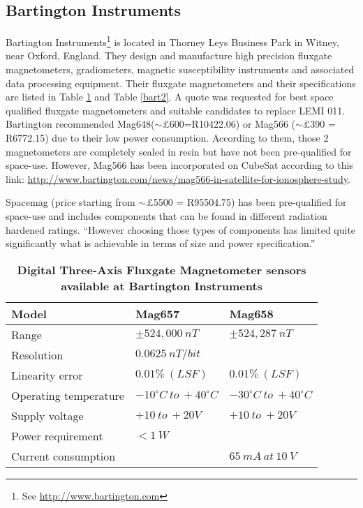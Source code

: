 \documentclass[a4paper,10pt]{report}
\begin{document}
\subsection*{Bartington Instruments}
Bartington Instruments\footnote{See \url{http://www.bartington.com}} is located in 
Thorney Leys Business Park in Witney, near Oxford, England. They design and
manufacture high precision fluxgate magnetometers, gradiometers, magnetic
susceptibility instruments and associated data processing equipment. Their fluxgate
magnetometers and their specifications are listed in
Table \ref{bart} and Table \ref{bart2}. A quote was requested for best space qualified
fluxgate
magnetometers and suitable candidates to replace LEMI 011. Bartington recommended 
Mag648($\sim\pounds$600=R10422.06) or Mag566 ($\sim\pounds$390 = R6772.15) due to
their low power consumption. According to them, those 2 magnetometers are completely
sealed in resin but have not been pre-qualified for space-use. However, Mag566 has
been incorporated on CubeSat according to this link:
\url{http://www.bartington.com/news/mag566-in-satellite-for-ionosphere-study}.
\par
Spacemag (price starting from $\sim\pounds$5500 = R95504.75) has been pre-qualified for
space-use and includes components that can be found in different radiation hardened
ratings. ``However choosing those types of components has limited quite significantly
what is achievable in terms of size and power specification.''
\begin{table}
\caption{\textbf{Digital Three-Axis Fluxgate Magnetometer sensors available at
Bartington Instruments}}
\label{bart} %
\centering
\begin{tabular}{|l|l|l|}
\hline
Model&Mag657&Mag658\\\hline
Range&$\pm 524,000\ nT$&$\pm524,287\  nT$\\\hline
Resolution&$0.0625\ nT/bit$&\\\hline
Linearity error&$0.01 \%\ (LSF)$&$0.01 \%\ (LSF)$\\\hline
Operating temperature&$-10^\circ C\ to\ +40^\circ C$&$-30^\circ C\ to\
+40^\circ C$\\\hline
Supply voltage&$+10\ to\ +20V$&$+10\ to\ +20V$\\\hline
Power requirement&$<1\ W$&\\\hline
Current consumption&&$65\ mA\ at\ 10\ V$\\\hline
\end{tabular}
\end{table}
\end{document}
